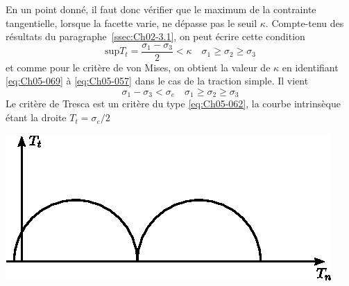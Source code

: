 En un point donné, il faut donc vérifier que le maximum de la contrainte tangentielle, lorsque la facette varie, ne dépasse pas le seuil $\kappa$. 
Compte-tenu des résultats du paragraphe~\ref{ssec:Ch02-3.1}, on peut écrire cette condition 
\begin{equation}
    \mathrm{sup} T_t = \frac{\sigma_1 - \sigma_3}{2} < \kappa \quad \sigma_1 \geq \sigma_2 \geq \sigma_3
    \label{eq:Ch05-069}
\end{equation}
et comme pour le critère de von Mises, on obtient la valeur de $\kappa$ en identifiant \eqref{eq:Ch05-069} à \eqref{eq:Ch05-057} dans le cas de la traction simple.
Il vient 
\begin{equation}
    \sigma_1 - \sigma_3 < \sigma_e \quad \sigma_1 \geq \sigma_2 \geq \sigma_3
    \label{eq:Ch05-070}
\end{equation}
Le critère de Tresca est un critère du type \eqref{eq:Ch05-062}, la courbe intrinsèque étant la droite $T_t = \sigma_e/2$ 
\begin{center}
    \includegraphics{../images/T1_Ch05-05}
\end{center}

